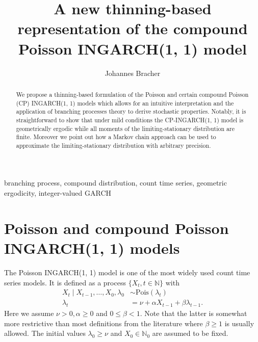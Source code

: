 \documentclass[review]{elsarticle}
\begin{document}
\title{A new thinning-based representation of the compound Poisson INGARCH(1, 1) model}
\author{Johannes Bracher}
\address{Chair of Statistics and Econometrics, Karlsruhe Institute of Technology, \\ %
Computational Statistics Group, Heidelberg Institute for Theoretical Studies}


\newcommand{\juv}{S}



\begin{abstract}
We propose a thinning-based formulation of the Poisson and certain compound Poisson (CP) INGARCH(1, 1) models which allows for an intuitive interpretation and the application of branching processes theory to derive stochastic properties. Notably, it is straightforward to show that under mild conditions the CP-INGARCH(1, 1) model is geometrically ergodic while all moments of the limiting-stationary distribution are finite. Moreover we point out how a Markov chain approach can be used to approximate the limiting-stationary distribution with arbitrary precision.
\end{abstract}

\begin{keyword}
branching process, compound distribution, count time series, geometric ergodicity, integer-valued GARCH
\end{keyword}

\maketitle


\section{Poisson and compound Poisson INGARCH(1, 1) models}
\label{sec:original_formulation}

The Poisson INGARCH(1, 1) model \cite{Ferland2006, Fokianos2009} is one of the most widely used count time series models. It is defined as a process $\{X_t, t \in \mathbb{N}\}$ with
\begin{align}
X_t \mid X_{t - 1}, \dots, X_0, \lambda_0 & \sim \text{Pois}(\lambda_t)\label{eq:X_t_original}\\
\lambda_t & = \nu + \alpha X_{t - 1} + \beta \lambda_{t - 1}. \label{eq:lambda_t}
\end{align}
Here we assume $\nu > 0, \alpha \geq 0$ and $0 \leq \beta < 1$. Note that the latter is somewhat more restrictive than most definitions from the literature where $\beta \geq 1$ is usually allowed. The initial values $\lambda_0 \geq \nu$ and $X_0 \in \mathbb{N}_0$ are assumed to be fixed.
\end{document}
